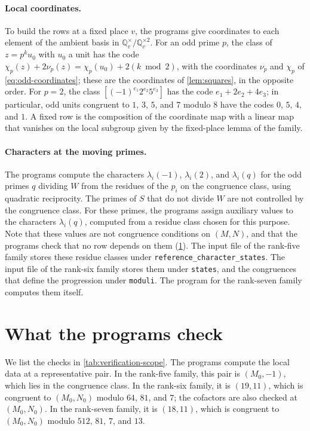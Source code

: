 \documentclass[12pt,oneside,openany]{book}
\theoremstyle{definition}
\theoremstyle{plain}
\numberwithin{equation}{chapter}
\theoremstyle{plain}
\theoremstyle{definition}
\theoremstyle{remark}
\newcommand{\Q}{\mathbb Q}
\newcommand{\sq}[1]{[#1]}
\newcommand{\sqgp}[1]{#1^{\times}/#1^{\times2}}
\begin{document}
\paragraph{Local coordinates.} To build the rows at a fixed place $v$, the programs give coordinates to each element of the ambient basis in $\sqgp{\Q_v}$. For an odd prime $p$, the class of $z=p^ku_0$ with $u_0$ a unit has the code $\chi_p(z)+2\nu_p(z)=\chi_p(u_0)+2(k\bmod2)$, with the coordinates $\nu_p$ and $\chi_p$ of \eqref{eq:odd-coordinates}; these are the coordinates of \cref{lem:squares}, in the opposite order. For $p=2$, the class $\sq{(-1)^{e_1}2^{e_2}5^{e_3}}$ has the code $e_1+2e_2+4e_3$; in particular, odd units congruent to $1$, $3$, $5$, and $7$ modulo $8$ have the codes $0$, $5$, $4$, and $1$. A fixed row is the composition of the coordinate map with a linear map that vanishes on the local subgroup given by the fixed-place lemma of the family.

\paragraph{Characters at the moving primes.} The programs compute the characters $\lambda_i(-1)$, $\lambda_i(2)$, and $\lambda_i(q)$ for the odd primes $q$ dividing $W$ from the residues of the $p_i$ on the congruence class, using quadratic reciprocity. The primes of $S$ that do not divide $W$ are not controlled by the congruence class. For these primes, the programs assign auxiliary values to the characters $\lambda_i(q)$, computed from a residue class chosen for this purpose. Note that these values are not congruence conditions on $(M,N)$, and that the programs check that no row depends on them (\cref{sec:verification-scope}). The input file of the rank-five family stores these residue classes under \texttt{reference\_character\_states}. The input file of the rank-six family stores them under \texttt{states}, and the congruences that define the progression under \texttt{moduli}. The program for the rank-seven family computes them itself.

\section{What the programs check}\label{sec:verification-scope}

We list the checks in \cref{tab:verification-scope}. The programs compute the local data at a representative pair. In the rank-five family, this pair is $(M_0,-1)$, which lies in the congruence class. In the rank-six family, it is $(19,11)$, which is congruent to $(M_0,N_0)$ modulo $64$, $81$, and $7$; the cofactors are also checked at $(M_0,N_0)$. In the rank-seven family, it is $(18,11)$, which is congruent to $(M_0,N_0)$ modulo $512$, $81$, $7$, and $13$.
\end{document}
